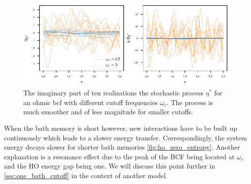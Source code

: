 \begin{figure}[htp]
  \centering
  \includegraphics{figs/analytic_comp/stocproc_comparison}
  \caption{\label{fig:stocproc_comparison} The imaginary part of ten
    realizations the stochastic process \(η^\ast\) for an ohmic bcf
    with different cutoff frequencies \(ω_{c}\). The process is much
    smoother and of less magnitude for smaller cutoffs.}
\end{figure}

When the bath memory is short however,
new interactions have to be built up continuously which leads to a
slower energy transfer. Correspondingly, the system energy decays
slower for shorter bath memories \cref{fig:ho_zero_entropy}. Another
explanation is a resonance effect due to the peak of the BCF being
located at \(ω_c\) and the HO energy gap being one. We will discuss
this point further in \cref{sec:one_bath_cutoff} in the context of
another model.

